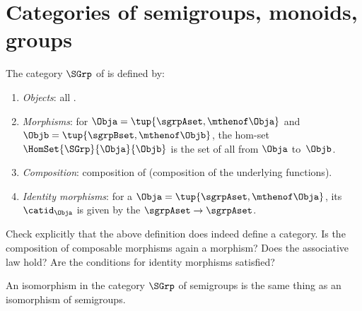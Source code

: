 
\section[Categories of semigroups, monoids, groups]{Categories of semigroups, monoids, groups}
\label{sec:cats-of-semigroups-monoids-groups}


\begin{ctdefinition}
    \label{def:SGrp}
    The category $\SGrp$ of  is defined by:
    \begin{enumerate}
        \item \emph{Objects}: all .
        \item \emph{Morphisms}: for  $\Obja = \tup{\sgrpAset,{ \mthenof \Obja}}$ and $\Objb = \tup{\sgrpBset,{ \mthenof \Objb}}$, the hom-\-set $\HomSet{\SGrp}{\Obja}{\Objb}$ is the set of all  from $\Obja$ to~$\Objb$.
        \item \emph{Composition}: composition of  (composition of the underlying functions).
        \item \emph{Identity morphisms}: for a  $\Obja = \tup{\sgrpAset, {\mthenof \Obja}}$, its  $\catid_\Obja$ is given by the  $\sgrpAset \to \sgrpAset$.
    \end{enumerate}
\end{ctdefinition}

\begin{gradedexercise}
    Check explicitly that the above definition does indeed define a category.
    Is the composition of composable morphisms again a morphism? Does the associative law hold? Are the conditions for identity morphisms satisfied?
\end{gradedexercise}


\begin{remark}
    An isomorphism in the category $\SGrp$ of semigroups is the same thing as an isomorphism of semigroups.
\end{remark}


